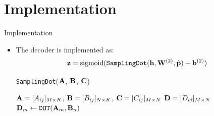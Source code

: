 \documentclass{beamer}
\begin{document}
\section{Implementation}
\begin{frame}{Implementation}
\begin{itemize}
\item The decoder is implemented as:
\[
{\bf z} = \mathrm{sigmoid}(\texttt{SamplingDot}({\bf h}, {\bf W}^{(2)}, \hat{\bf p}) + {\bf b}^{(2)})
\]
\vspace{-0.5cm}
\begin{center}
\begin{minipage}{0.9\textwidth}
    \begin{algorithm}[H]
    \caption{\texttt{SamplingDot}(${\bf A}$, ${\bf B}$, ${\bf C}$)}
    \begin{algorithmic}
    \INPUT ${\bf A} = [A_{ij}]_{M\times K}$, ${\bf B} = [B_{ij}]_{N\times K}$, ${\bf C} = [C_{ij}]_{M\times N}$
    \OUTPUT ${\bf D} = [D_{ij}]_{M\times N}$
    \STATE
                \STATE ${\bf D}_{m} \gets \texttt{DOT}({\bf A}_{m}, {\bf B}_{n})$
            \ENDIF
        \ENDFOR
    \ENDFOR
    \end{algorithmic}
    \end{algorithm}
\end{minipage}
\end{center}
\end{itemize}
\end{frame}
\end{document}
